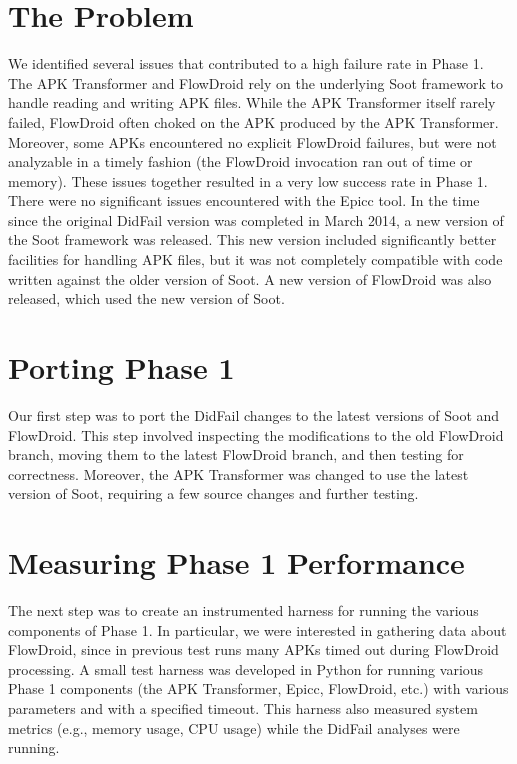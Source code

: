 \section{The Problem}
We identified several issues that contributed to a high failure rate in Phase 1.  The APK Transformer and FlowDroid rely on the underlying Soot framework to handle reading and writing APK files. While the APK Transformer itself rarely failed, FlowDroid often choked on the APK produced by the APK Transformer.  Moreover, some APKs encountered no explicit FlowDroid failures, but were not analyzable in a timely fashion (the FlowDroid invocation ran out of time or memory). These issues together resulted in a very low success rate in Phase 1. There were no significant issues encountered with the Epicc tool.  In the time since the original DidFail version was completed in March 2014, a new version of the Soot framework was released. This new version included significantly better facilities for handling APK files, but it was not completely compatible with code written against the older version of Soot. A new version of FlowDroid was also released, which used the new version of Soot.

\section{Porting Phase 1}
Our first step was to port the DidFail changes to the latest versions of Soot and FlowDroid.  This step involved inspecting the modifications to the old FlowDroid branch, moving them to the latest FlowDroid branch, and then testing for correctness.  Moreover, the APK Transformer was changed to use the latest version of Soot, requiring a few source changes and further testing.

\section{Measuring Phase 1 Performance}
The next step was to create an instrumented harness for running the various components of Phase 1.  In particular, we were interested in gathering data about FlowDroid, since in previous test runs many APKs timed out during FlowDroid processing.  A small test harness was developed in Python for running various Phase 1 components (the APK Transformer, Epicc, FlowDroid, etc.) with various parameters and with a specified timeout.  This harness also measured system metrics (e.g., memory usage, CPU usage) while the DidFail analyses were running.  

